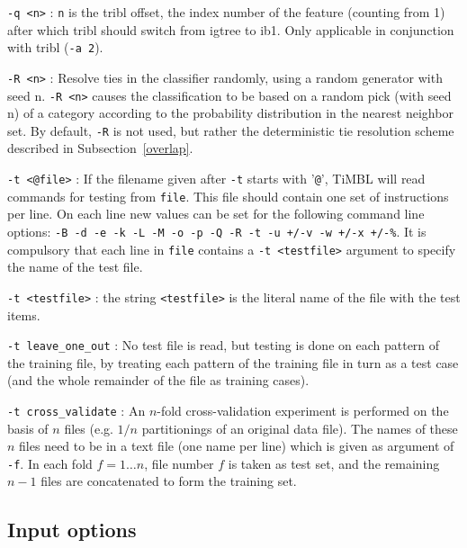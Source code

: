 \documentclass{report}
\begin{document}
\begin{description}
\item {\tt -q <n>} : {\tt n} is the {\sc tribl} offset, the index
number of the feature (counting from 1) after which {\sc tribl} should
switch from {\sc igtree} to {\sc ib1}. Only applicable in conjunction
with {\sc tribl} ({\tt -a 2}).

\item {\tt -R <n>} : Resolve ties in the classifier randomly, using a
random generator with seed n. {\tt -R <n>} causes the classification
to be based on a random pick (with seed n) of a category according to
the probability distribution in the nearest neighbor set. By default,
{\tt -R} is not used, but rather the deterministic tie resolution
scheme described in Subsection~\ref{overlap}.

\item {\tt -t <@file>} : If the filename given after {\tt -t} starts
with '{\tt @}', TiMBL will read commands for testing from {\tt file}.
This file should contain one set of instructions per line. On each
line new values can be set for the following command line options:
{\tt -B -d -e -k -L -M -o -p -Q -R -t -u +/-v -w +/-x +/-\%}. It is
compulsory that each line in {\tt file} contains a {\tt -t <testfile>}
argument to specify the name of the test file.

\item {\tt -t <testfile>} : the string {\tt <testfile>} is the literal name
of the file with the test items.

\item {\tt -t leave\_one\_out} : No test file is read, but testing is
done on each pattern of the training file, by treating each pattern of
the training file in turn as a test case (and the whole remainder of
the file as training cases).

\item {\tt -t cross\_validate} : An $n$-fold cross-validation
experiment is performed on the basis of $n$ files (e.g. $1/n$
partitionings of an original data file). The names of these $n$ files
need to be in a text file (one name per line) which is given as
argument of {\tt -f}. In each fold $f=1 \ldots n$, file number $f$ is
taken as test set, and the remaining $n-1$ files are concatenated to
form the training set.

\end{description}

\subsection{Input options}
\end{document}
